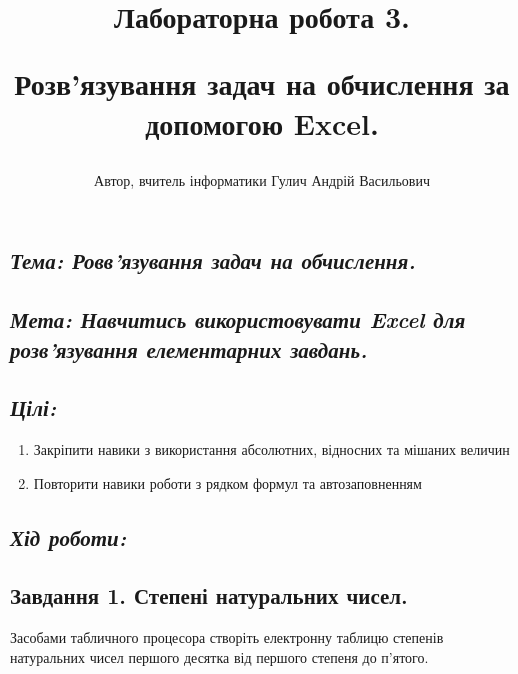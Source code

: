 \documentclass{article}
\title{Лабораторна робота 3.
	
Розв’язування задач на обчислення за допомогою Excel.
}
\author{Автор, вчитель інформатики Гулич Андрій Васильович}
\begin{document}
	
	\maketitle
	\subsection*{\textit{Тема: Ровв'язування задач на обчислення. }}
	\subsection*{\textit{Мета: Навчитись використовувати Excel для розв'язування елементарних завдань. }} 
	
	\subsection*{\textit{Цілі: }} 
	\begin{enumerate}
		\item Закріпити навики з використання абсолютних, відносних та мішаних величин
		\item Повторити навики роботи з рядком формул та автозаповненням
	\end{enumerate}
	\begin{center}
	\subsection*{\textit{Хід роботи: }} 
	\subsection*{\textbf{Завдання 1. Степені натуральних чисел. }} 
	\end{center}

	Засобами табличного процесора створіть електронну таблицю степенів натуральних чисел першого десятка від першого степеня до п'ятого.
	
\end{document}
